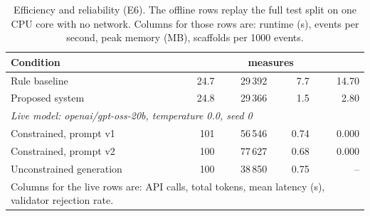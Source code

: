 \begin{table}[t]
\centering
\caption{Efficiency and reliability (E6). The offline rows replay the full test split on
one CPU core with no network. Columns for those rows are: runtime (s), events per second,
peak memory (MB), scaffolds per 1000 events.}
\label{tab:efficiency}
\begin{tabular}{lrrrr}
\toprule
Condition & \multicolumn{4}{c}{measures} \\
\midrule
Rule baseline & 24.7 & 29\,392 & 7.7 & 14.70 \\
Proposed system & 24.8 & 29\,366 & 1.5 & 2.80 \\
\midrule
\multicolumn{5}{l}{\textit{Live model: openai/gpt-oss-20b, temperature 0.0, seed 0}} \\
Constrained, prompt v1 & 101 & 56\,546 & 0.74 & 0.000 \\
Constrained, prompt v2 & 100 & 77\,627 & 0.68 & 0.000 \\
Unconstrained generation & 100 & 38\,850 & 0.75 & -- \\
\multicolumn{5}{p{0.92\columnwidth}}{\footnotesize Columns for the live rows are: API calls, total tokens, mean latency (s), validator rejection rate.} \\
\bottomrule
\end{tabular}
\end{table}
